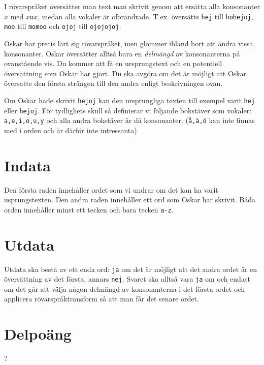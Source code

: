 I rövarspråket översätter man text man skrivit genom att ersätta alla konsonanter $x$ med $x$\texttt{o}$x$, medan alla vokaler är oförändrade. T.ex. översätts \texttt{hej} till \texttt{hohejoj}, \texttt{moo} till \texttt{momoo} och \texttt{ojoj} till \texttt{ojojojoj}.

Oskar har precis lärt sig rövarspråket, men glömmer ibland bort att ändra vissa konsonanter. Oskar översätter alltså bara en \emph{delmängd} av konsonanterna på ovanstående vis. Du kommer att få en ursprungstext och en potentiell översättning som Oskar har gjort. Du ska avgöra om det är möjligt att Oskar översatte den första strängen till den andra enligt beskrivningen ovan.

Om Oskar hade skrivit \texttt{hejoj} kan den ursprungliga texten till exempel varit \texttt{hej} eller \texttt{hejoj}. För tydlighets skull så definierar vi följande bokstäver som vokaler: \texttt{a,e,i,o,u,y} och alla andra bokstäver är då konsonanter. (\texttt{å,ä,ö} kan inte finnas med i orden och är därför inte intressanta)

\section*{Indata}
Den första raden innehåller ordet som vi undrar om det kan ha varit usprungstexten. Den andra raden innehåller ett ord som Oskar har skrivit. Båda orden innehåller minst ett tecken och bara tecken \texttt{a-z}.

\section*{Utdata}
Utdata ska bestå av ett enda ord: \texttt{ja} om det är möjligt att det andra ordet är en översättning av det första, annars \texttt{nej}. Svaret ska alltså vara \texttt{ja} om och endast om det går att välja någon delmängd av konsonanterna i det första ordet och applicera rövarspråktransform så att man får det senare ordet.

\section*{Delpoäng}
?
